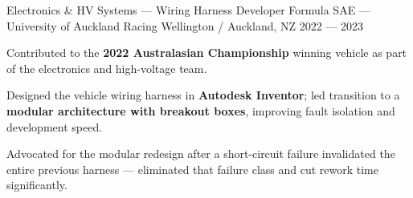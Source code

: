\cventry%
    {Electronics \& HV Systems --- Wiring Harness Developer}
    {Formula SAE --- University of Auckland Racing}
    {Wellington / Auckland, NZ}
    {2022 --- 2023}
    {
      \begin{cvitems}
        \item {Contributed to the \textbf{2022 Australasian Championship} winning vehicle as part of the electronics and high-voltage team.}
        \item {Designed the vehicle wiring harness in \textbf{Autodesk Inventor}; led transition to a \textbf{modular architecture with breakout boxes}, improving fault isolation and development speed.}
        \item {Advocated for the modular redesign after a short-circuit failure invalidated the entire previous harness --- eliminated that failure class and cut rework time significantly.}
      \end{cvitems}
    }
